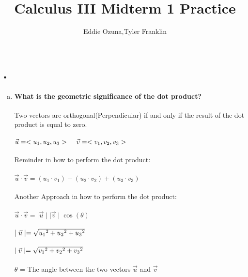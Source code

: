 \documentclass{article}
\title{Calculus III Midterm 1 Practice}
\author{Eddie Ozuna,Tyler Franklin}
\begin{document}
\maketitle
\section{.}
\begin{enumerate}[a.]
	\item \textbf{What is the geometric significance of the dot product? }\\
	\\
Two vectors are orthogonal(Perpendicular) if and only if the result of the dot product is equal to zero.\\\\
$\vec{u} = <u_{1},u_{2},u_{3}>\hspace{.4cm}\vec{v} = <v_{1},v_{2},v_{3}>$\\
\\
Reminder in how to perform the dot product:\\
\\
$\vec{u} \cdot \vec{v} = (u_{1} \cdot v_{1}) + (u_{2} \cdot v_{2}) + (u_{3} \cdot v_{3}) $\\
\\
Another Approach in how to perform the dot product:\\
\\
$\vec{u} \cdot \vec{v} =  \mid\vec{u}\mid\mid\vec{v}\mid\cos(\theta)$\\
\\
$\mid\vec{u}\mid = \sqrt{u_{1}\hspace{.001cm}^{2}+u_{2}\hspace{.001cm}^{2}+u_{3}\hspace{.001cm}^{2}}$\\
\\
$\mid\vec{v}\mid = \sqrt{v_{1}\hspace{.001cm}^{2}+v_{2}\hspace{.001cm}^{2}+v_{3}\hspace{.001cm}^{2}}$\\
\\
$\theta$ = The angle between the two vectors $\vec{u}$ and $\vec{v}$
\end{enumerate}
\end{document}
